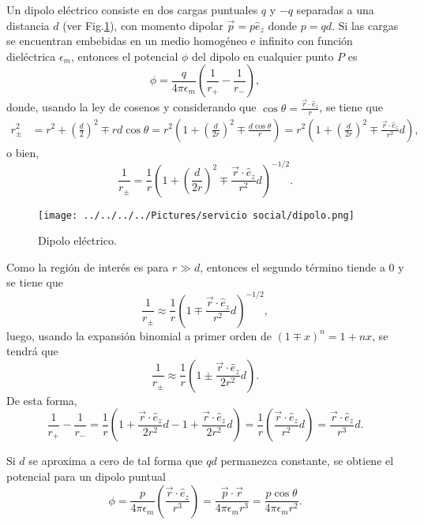 \documentclass[paper=letter, fontsize=12pt,]{article}
\begin{document}
Un dipolo eléctrico consiste en dos cargas puntuales $q$ y $-q$ separadas a una distancia $d$ (ver Fig.\ref{dipolo_elec}), con momento dipolar $\Vec{p}=p\hat{e}_z$ donde $p=qd$. Si las cargas se encuentran embebidas en un medio homogéneo e infinito con función dieléctrica $\epsilon_m$, entonces el potencial $\phi$ del dipolo en cualquier punto $P$ es \cite{Bohren,Griffiths}
\begin{equation}
    \phi=\frac{q}{4\pi\epsilon_m}\left(\frac{1}{r_+}-\frac{1}{r_{-}}\right),    
\end{equation}
donde, usando la ley de cosenos y considerando que $\cos\theta=\frac{\Vec{r}\cdot\hat{e}_z}{r}$, se tiene que 
\begin{align*}
    r_{\pm}^2&=r^2+\left(\frac{d}{2}\right)^2 \mp rd\cos\theta=r^2\left(1+\left(\frac{d}{2r}\right)^2\mp \frac{d\cos\theta}{r}\right)=r^2\left(1+\left(\frac{d}{2r}\right)^2\mp \frac{\Vec{r}\cdot\hat{e}_z}{r^2}d\right),
\end{align*}
o bien,
\begin{equation*}
  \frac{1}{r_{\pm}}=\frac{1}{r}\left(1+\left(\frac{d}{2r}\right)^2\mp \frac{\Vec{r}\cdot\hat{e}_z}{r^2}d\right)^{-1/2}.  
\end{equation*}
\begin{figure}
    \centering
    \texttt{[image: ../../../../Pictures/servicio social/dipolo.png]} 
    \caption{Dipolo eléctrico.}
    \label{dipolo_elec}
\end{figure}
Como la región de interés es para $r\gg d$, entonces el segundo término tiende a 0 y se tiene que
\begin{equation*}
    \frac{1}{r_{\pm}}\approx\frac{1}{r}\left(1\mp \frac{\Vec{r}\cdot\hat{e}_z}{r^2}d\right)^{-1/2},
\end{equation*}
luego, usando la expansión binomial a primer orden de $(1\mp x)^n=1+nx$,  se tendrá que
\begin{equation*}
    \frac{1}{r_{\pm}}\approx\frac{1}{r}\left(1\pm \frac{\Vec{r}\cdot\hat{e}_z}{2r^2}d\right).
\end{equation*}
De esta forma,
\begin{equation}
    \frac{1}{r_+}-\frac{1}{r_{-}}=\frac{1}{r}\left(1+ \frac{\Vec{r}\cdot\hat{e}_z}{2r^2}d-1+ \frac{\Vec{r}\cdot\hat{e}_z}{2r^2}d\right)=\frac{1}{r}\left( \frac{\Vec{r}\cdot\hat{e}_z}{r^2}d\right)=\frac{\Vec{r}\cdot\hat{e}_z}{r^3}d.    
\end{equation}

Si $d$ se aproxima a cero de tal forma que $qd$ permanezca constante, se obtiene el potencial para un dipolo puntual
\begin{equation}
\phi=\frac{p}{4\pi\epsilon_m}\left(\frac{\Vec{r}\cdot\hat{e}_z}{r^3}\right)=\frac{\Vec{p}\cdot\Vec{r}}{4\pi\epsilon_m r^3}=\frac{p\cos\theta}{4\pi\epsilon_m r^2}.
\label{pot_dipolo}
\end{equation}
\end{document}
